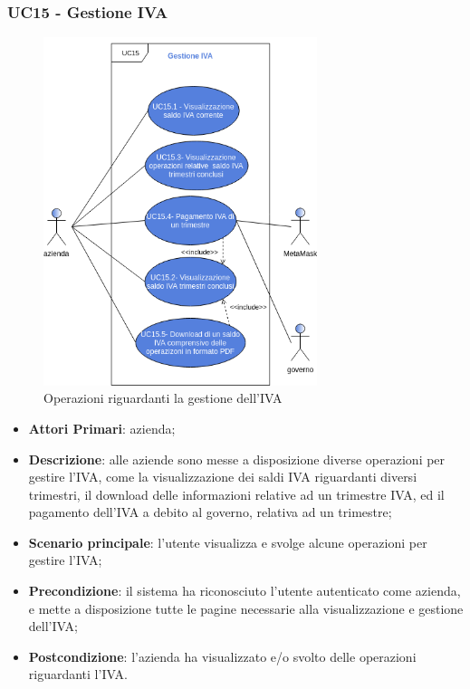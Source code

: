 \subsubsection{UC15 - Gestione IVA}
\begin{figure}[H]
	\includegraphics[width=8cm]{res/images/UC15-Generale.png}
	\centering
	\caption{Operazioni riguardanti la gestione dell'IVA}
\end{figure}
\begin{itemize}
	\item \textbf{Attori Primari}: azienda;
	\item \textbf{Descrizione}: alle aziende sono messe a disposizione diverse operazioni per gestire l'IVA, come la visualizzazione dei saldi IVA riguardanti diversi trimestri, il download delle informazioni relative ad un trimestre IVA, ed il pagamento dell'IVA a debito al governo\glo, relativa ad un trimestre;
	\item \textbf{Scenario principale}: l'utente visualizza e svolge alcune operazioni per gestire l'IVA;
	\item \textbf{Precondizione}: il sistema ha riconosciuto l'utente autenticato come azienda, e mette a disposizione tutte le pagine necessarie alla visualizzazione e gestione dell'IVA;
	\item \textbf{Postcondizione}: l'azienda ha visualizzato e/o svolto delle operazioni riguardanti l'IVA.
\end{itemize} 
